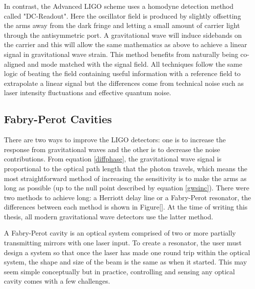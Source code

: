 		In contrast, the Advanced LIGO scheme uses a homodyne detection \cite{HildDCReadout} method called "DC-Readout".  Here the oscillator field is produced by slightly offsetting the arms away from the dark fringe and letting a small amount of carrier light through the antisymmetric port.  A gravitational wave will induce sidebands on the carrier and this will allow the same mathematics as above to achieve a linear signal in gravitational wave strain. This method benefits from naturally being co-aligned and mode matched with the signal field.  All techniques follow the same logic of beating the field containing useful information with a reference field to extrapolate a linear signal but the differences come from technical noise such as laser intensity fluctuations and effective quantum noise.
		
		\cite{BlackPDH}	
	
		\subsection{Fabry-Perot Cavities}\label{FP}
		There are two ways to improve the LIGO detectors: one is to increase the response from gravitational waves and the other is to decrease the noise contributions. From equation \ref{diffphase}, the gravitational wave signal is proportional to the optical path length that the photon travels, which means the most straightforward method of increasing the sensitivity is to make the arms as long as possible (up to the null point described by equation \ref{gwsinc}).  There were two methods to achieve long: a Herriott delay line or a Fabry-Perot resonator, the differences between each method is shown in Figure[].  At the time of writing this thesis, all modern gravitational wave detectors use the latter method.
	
		A Fabry-Perot cavity is an optical system comprised of two or more partially transmitting mirrors with one laser input.  To create a resonator, the user must design a system so that once the laser has made one round trip within the optical system, the shape and size of the beam is the same as when it started.  This may seem simple conceptually but in practice, controlling and sensing any optical cavity comes with a few challenges.
		
